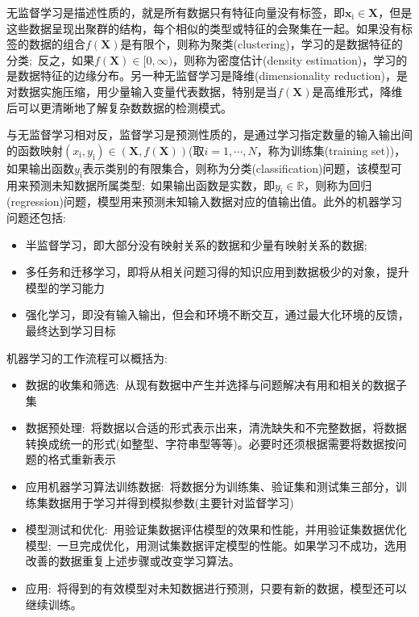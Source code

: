 无监督学习是描述性质的，就是所有数据只有特征向量没有标签，即$\mathbf{x}_{\mathrm{i}}\in\mathbf{X}$，但是这些数据呈现出聚群的结构，每个相似的类型或特征的会聚集在一起。如果没有标签的数据的组合$f(\mathbf{X})$是有限个，则称为聚类\textrm{(clustering)}，学习的是数据特征的分类;~反之，如果$f(\mathbf{X})\in[0,\infty)$，则称为密度估计\textrm{(density estimation)}，学习的是数据特征的边缘分布。另一种无监督学习是降维\textrm{(dimensionality reduction)}，是对数据实施压缩，用少量输入变量代表数据，特别是当$f(\mathbf{X})$是高维形式，降维后可以更清晰地了解复杂数数据的检测模式。

与无监督学习相对反，监督学习是预测性质的，是通过学习指定数量的输入输出间的函数映射$(x_{\mathrm{i}},y_{\mathrm{i}})\in(\mathbf{X},f(\mathbf{X}))$(取$i=1,\cdots,N$，称为训练集\textrm{(training set)})，如果输出函数$y_{\mathrm{i}}$表示类别的有限集合，则称为分类\textrm{(classification)}问题，该模型可用来预测未知数据所属类型;~如果输出函数是实数，即$y_\mathrm{i}\in\mathbb{R}$，则称为回归\textrm{(regression)}问题，模型用来预测未知输入数据对应的值输出值。此外的机器学习问题还包括:~
\begin{itemize}
	\item 半监督学习，即大部分没有映射关系的数据和少量有映射关系的数据;
	\item 多任务和迁移学习，即将从相关问题习得的知识应用到数据极少的对象，提升模型的学习能力
	\item 强化学习，即没有输入输出，但会和环境不断交互，通过最大化环境的反馈，最终达到学习目标
\end{itemize}

机器学习的工作流程可以概括为\cite{Efficient_ML}:
\begin{itemize}
	\item 数据的收集和筛选:~从现有数据中产生并选择与问题解决有用和相关的数据子集
	\item 数据预处理:~将数据以合适的形式表示出来，清洗缺失和不完整数据，将数据转换成统一的形式(如整型、字符串型等等)。必要时还须根据需要将数据按问题的格式重新表示
	\item 应用机器学习算法训练数据:~将数据分为训练集、验证集和测试集三部分，训练集数据用于学习并得到模拟参数(主要针对监督学习)
	\item 模型测试和优化:~用验证集数据评估模型的效果和性能，并用验证集数据优化模型;~一旦完成优化，用测试集数据评定模型的性能。如果学习不成功，选用改善的数据重复上述步骤或改变学习算法。
	\item 应用:~将得到的有效模型对未知数据进行预测，只要有新的数据，模型还可以继续训练。
\end{itemize}

